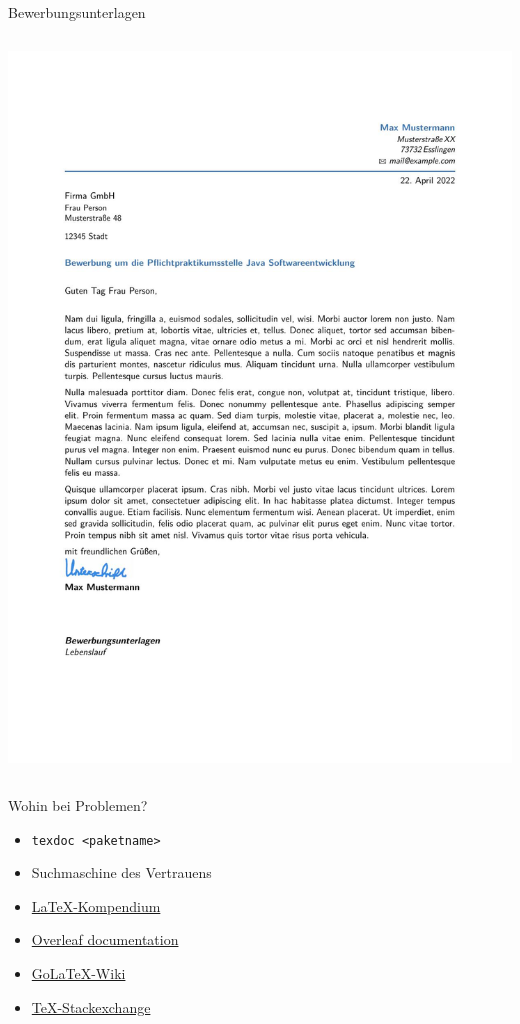 \documentclass[presentation,aspectratio=169]{beamer}
\begin{document}
\begin{frame}[fragile]{Bewerbungsunterlagen}
\begin{columns}
      \includegraphics[height=.7\textheight]{Anschreiben}
  \end{columns}
\end{frame}

\begin{frame}[fragile]{Wohin bei Problemen?}
  \begin{itemize}
    \item \verb|texdoc <paketname>|
    \item Suchmaschine des Vertrauens
    \item \href{https://de.wikibooks.org/wiki/LaTeX-Kompendium}{\LaTeX-Kompendium}
    \item \href{https://www.overleaf.com/learn}{Overleaf documentation}
    \item \href{https://golatex.de/wiki/index.php/Hauptseite}{Go\LaTeX-Wiki}
    \item \href{https://tex.stackexchange.com}{\TeX-Stackexchange}
  \end{itemize}
\end{frame}

\maketitle
\end{document}
